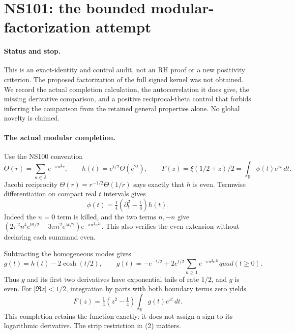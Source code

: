 \section*{NS101: the bounded modular-factorization attempt}
\paragraph{Status and stop.}
This is an exact-identity and control audit, not an RH proof or a new
positivity criterion. The proposed factorization of the full signed kernel
was not obtained. We record the actual completion calculation, the
autocorrelation it does give, the missing derivative comparison, and a
positive reciprocal-theta control that forbids inferring the comparison
from the retained general properties alone. No global novelty is claimed.

\paragraph{The actual modular completion.}
Use the NS100 convention
\[
 \Theta(r)=\sum_{n\in\mathbb Z}e^{-\pi n^2r},\qquad
 h(t)=e^{t/2}\Theta(e^{2t}),\qquad
 F(z)=\xi(1/2+z)/2=\int_{\mathbb R}\phi(t)e^{zt}\,dt.
\]
Jacobi reciprocity $\Theta(r)=r^{-1/2}\Theta(1/r)$ says exactly that
$h$ is even. Termwise differentiation on compact real $t$ intervals gives
\[
 \phi(t)=\tfrac14(\partial_t^2-\tfrac14)h(t).
 \tag{1}
\]
Indeed the $n=0$ term is killed, and the two terms $n, -n$ give
$(2\pi^2 n^4e^{9t/2}-3\pi n^2e^{5t/2})e^{-\pi n^2e^{2t}}$.
This also verifies the even extension without declaring each summand even.

Subtracting the homogeneous modes gives
\[
 g(t)=h(t)-2\cosh(t/2),\qquad
 g(t)=-e^{-t/2}+2e^{t/2}\sum_{n\ge1}e^{-\pi n^2e^{2t}}quad(t\ge0).
\]
Thus $g$ and its first two derivatives have exponential tails of rate
$1/2$, and $g$ is even. For $|\Re z|<1/2$, integration by parts with
both boundary terms zero yields
\[
 F(z)=\tfrac14(z^2-\tfrac14)\int_{\mathbb R}g(t)e^{zt}\,dt. \tag{2}
\]
This completion retains the function exactly; it does not assign a sign
to its logarithmic derivative. The strip restriction in (2) matters.

